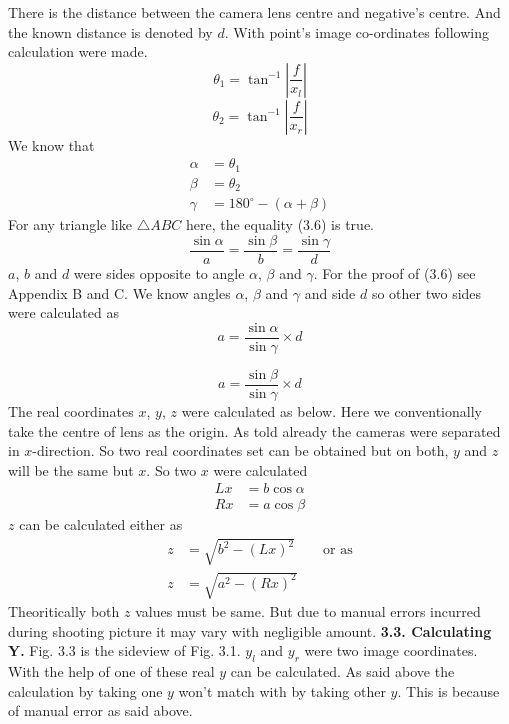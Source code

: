 \documentclass[12pt]{report}
\begin{document}
  There is the distance between the camera lens centre and negative's centre. 
\vspace{0.5cm} And the known distance is denoted by $d$. \vspace{0.5cm} With point's image co-ordinates following calculation were made. \begin{equation} \theta_{1} = \tan^{-1} \left| \frac{f}{x_{l}} \right| \tag{3.1} \end{equation} \begin{equation} \theta_{2} = \tan^{-1} \left| \frac{f}{x_{r}} \right| \tag{3.2} \end{equation} We know that \begin{align} \alpha &= \theta_{1} \tag{3.3}\\[6pt] \beta &= \theta_{2} \tag{3.4}\\[6pt] \gamma &= 180^\circ - (\alpha + \beta) \tag{3.5} \end{align} For any triangle like $\triangle ABC$ here, the equality (3.6) is true. \begin{equation} \frac{\sin\alpha}{a} = \frac{\sin\beta}{b} = \frac{\sin\gamma}{d} \tag{3.6} \end{equation} $a$, $b$ and $d$ were sides opposite to angle $\alpha$, $\beta$ and $\gamma$. \vspace{0.5cm} For the proof of (3.6) see Appendix B and C. \vspace{0.5cm} We know angles $\alpha$, $\beta$ and $\gamma$ and side $d$ so other two sides were calculated as \begin{equation} a = \frac{\sin\alpha}{\sin\gamma} \times d \tag{3.7} \end{equation}


\begin{equation} a = \frac{\sin\beta}{\sin\gamma} \times d \tag{3.8} \end{equation} The real coordinates $x$, $y$, $z$ were calculated as below. Here we conventionally take the centre of lens as the origin. \vspace{0.5cm} As told already the cameras were separated in $x$-direction. So two real coordinates set can be obtained but on both, $y$ and $z$ will be the same but $x$. So two $x$ were calculated \begin{align} Lx &= b\cos\alpha \tag{3.9}\\[6pt] Rx &= a\cos\beta \tag{3.10} \end{align} $z$ can be calculated either as \begin{align} z &= \sqrt{b^{2} - (Lx)^{2}} \qquad \text{or as} \tag{3.11}\\[6pt] z &= \sqrt{a^{2} - (Rx)^{2}} \tag{3.12} \end{align} Theoritically both $z$ values must be same. But due to manual errors incurred during shooting picture it may vary with negligible amount. \vspace{1cm} \noindent \textbf{3.3. Calculating Y.} \vspace{0.5cm} Fig. 3.3 is the sideview of Fig. 3.1. $y_l$ and $y_r$ were two image coordinates. With the help of one of these real $y$ can be calculated. As said above the calculation by taking one $y$ won't match with by taking other $y$. This is because of manual error as said above.
\end{document}
